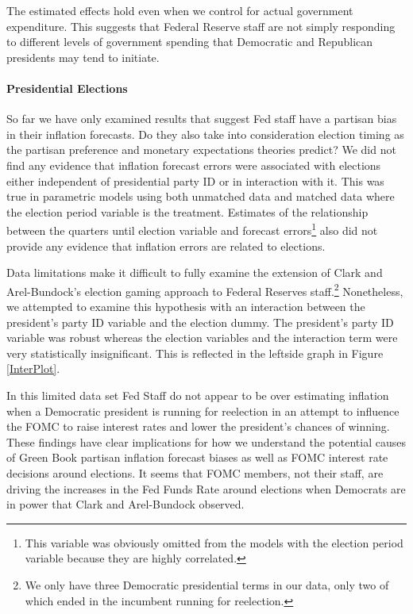 \documentclass[a4paper]{article}\usepackage{graphicx, color}
\begin{document}
The estimated effects hold even when we control for actual government expenditure. This suggests that Federal Reserve staff are not simply responding to different levels of government spending that Democratic and Republican presidents may tend to initiate.

\paragraph{Presidential Elections}

So far we have only examined results that suggest Fed staff have a partisan bias in their inflation forecasts. Do they also take into consideration election timing as the partisan preference and monetary expectations theories predict? We did not find any evidence that inflation forecast errors were associated with elections either independent of presidential party ID or in interaction with it. This was true in parametric models using both unmatched data and matched data where the election period variable is the treatment. Estimates of the relationship between the quarters until election variable and forecast errors\footnote{This variable was obviously omitted from the models with the election period variable because they are highly correlated.} also did not provide any evidence that inflation errors are related to elections. 

Data limitations make it difficult to fully examine the extension of Clark and Arel-Bundock's \citeyearpar{Clark2011} election gaming approach to Federal Reserves staff.\footnote{We only have three Democratic presidential terms in our data, only two of which ended in the incumbent running for reelection.} Nonetheless, we attempted to examine this hypothesis with an interaction between the president's party ID variable and the election dummy. The president's party ID variable was robust whereas the election variables and the interaction term were very statistically insignificant. This is reflected in the leftside graph in Figure \ref{InterPlot}. 

In this limited data set Fed Staff do not appear to be over estimating inflation when a Democratic president is running for reelection in an attempt to influence the FOMC to raise interest rates and lower the president's chances of winning. These findings have clear implications for how we understand the potential causes of Green Book partisan inflation forecast biases as well as FOMC interest rate decisions around elections. It seems that FOMC members, not their staff, are driving the increases in the Fed Funds Rate around elections when Democrats are in power that Clark and Arel-Bundock observed. 
\end{document}
